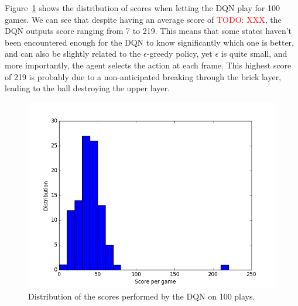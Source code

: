 \documentclass[letterpaper]{article}
\newcommand\todo[1]{\textcolor{red}{TODO: #1}}
\begin{document}
Figure~\ref{fig:dqn uniform scores dist} shows the distribution of scores when letting the DQN play for 100 games. We can see that despite having an
average score of \todo{XXX}, the DQN outputs score ranging from 7 to 219. This means that some states haven't been encountered enough for the
DQN to know significantly which one is better, and can also be slightly related to the $\epsilon$-greedy policy, yet $\epsilon$ is quite small,
and more importantly, the agent selects the action at each frame. This highest score of 219 is probably due to a non-anticipated breaking through
the brick layer, leading to the ball destroying the upper layer.

\begin{figure}
	\includegraphics[width=.5\textwidth]{figures/dqn_uniform_score_distribution}
	\caption{Distribution of the scores performed by the DQN on 100 plays.\label{fig:dqn uniform scores dist}}
\end{figure}
\end{document}
